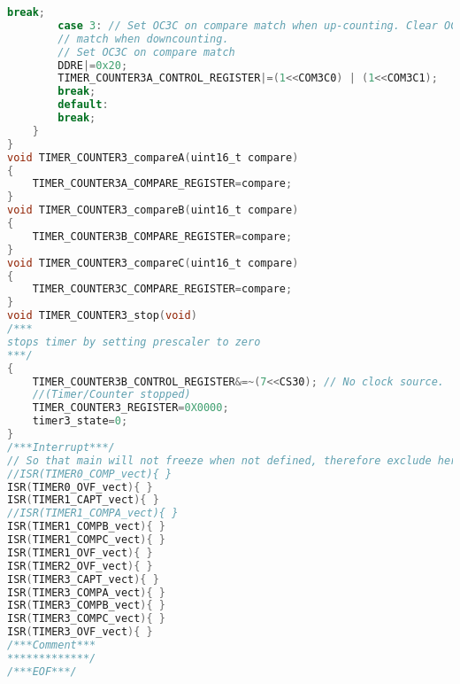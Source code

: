 \begin{lstlisting}[language=C, caption={atmega128timer.c}, label=atmega128timer-c, captionpos=b]
		break;
		case 3: // Set OC3C on compare match when up-counting. Clear OC0 on compare
		// match when downcounting.
		// Set OC3C on compare match
		DDRE|=0x20;
		TIMER_COUNTER3A_CONTROL_REGISTER|=(1<<COM3C0) | (1<<COM3C1);
		break;
		default:
		break;
	}
}
void TIMER_COUNTER3_compareA(uint16_t compare)
{
	TIMER_COUNTER3A_COMPARE_REGISTER=compare;
}
void TIMER_COUNTER3_compareB(uint16_t compare)
{
	TIMER_COUNTER3B_COMPARE_REGISTER=compare;
}
void TIMER_COUNTER3_compareC(uint16_t compare)
{
	TIMER_COUNTER3C_COMPARE_REGISTER=compare;
}
void TIMER_COUNTER3_stop(void)
/***
stops timer by setting prescaler to zero
***/
{
	TIMER_COUNTER3B_CONTROL_REGISTER&=~(7<<CS30); // No clock source.
	//(Timer/Counter stopped)
	TIMER_COUNTER3_REGISTER=0X0000;
	timer3_state=0;
}
/***Interrupt***/
// So that main will not freeze when not defined, therefore exclude here! before use.
//ISR(TIMER0_COMP_vect){ }
ISR(TIMER0_OVF_vect){ }
ISR(TIMER1_CAPT_vect){ }
//ISR(TIMER1_COMPA_vect){ }
ISR(TIMER1_COMPB_vect){ }
ISR(TIMER1_COMPC_vect){ }
ISR(TIMER1_OVF_vect){ }
ISR(TIMER2_OVF_vect){ }
ISR(TIMER3_CAPT_vect){ }
ISR(TIMER3_COMPA_vect){ }
ISR(TIMER3_COMPB_vect){ }
ISR(TIMER3_COMPC_vect){ }
ISR(TIMER3_OVF_vect){ }
/***Comment***
*************/
/***EOF***/
\end{lstlisting}
